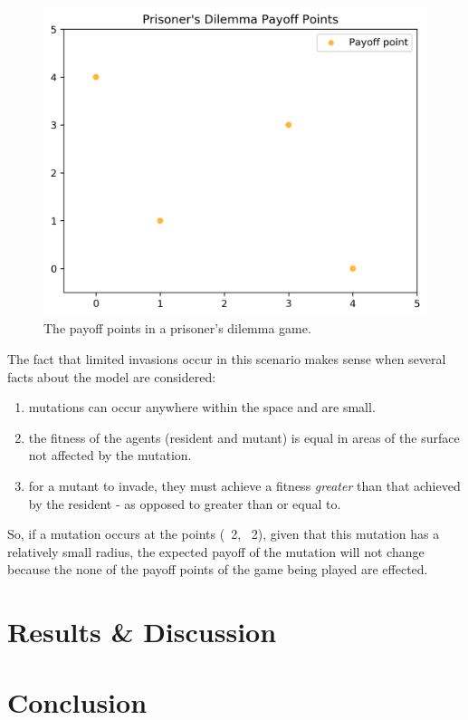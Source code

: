 \documentclass[11pt]{book}
\newcommand*{\np}{\par\noindent\newline}
\begin{document}
\begin{figure}
	\centering
	\includegraphics[scale=0.75]{resources/prisoners_dilemma_payoffs.png}
	\caption{The payoff points in a prisoner's dilemma game.}
	\label{prisoners_payoff_plot}
\end{figure}

\np The fact that limited invasions occur in this scenario makes sense when several facts about the model are considered:
\begin{enumerate}[label=(\alph*)]
	\item mutations can occur anywhere within the space and are small.
	\item the fitness of the agents (resident and mutant) is equal in areas of the surface not affected by the mutation.
	\item for a mutant to invade, they must achieve a fitness \textit{greater} than that achieved by the resident - as opposed to greater than or equal to.	
\end{enumerate} 

So, if a mutation occurs at the points (~2, ~2), given that this mutation has a relatively small radius, the expected payoff of the mutation will not change because the none of the payoff points of the game being played are effected.


\chapter{Results \& Discussion}

\chapter{Conclusion}

\newpage


\end{document}
